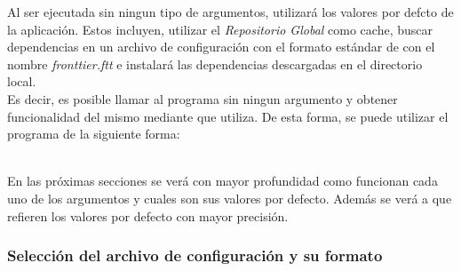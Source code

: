 Al ser ejecutada sin ningun tipo de argumentos, \fronttier utilizará los
valores por defcto de la aplicación. Estos incluyen, utilizar el
\emph{Repositorio Global} como cache, buscar dependencias en un archivo de
configuración con el formato estándar de \fronttier con el nombre
\emph{fronttier.ftt} e instalará las dependencias descargadas en el directorio
local.\\
Es decir, es posible llamar al programa sin ningun argumento y obtener
funcionalidad del mismo mediante  que \fronttier
utiliza. De esta forma, se puede utilizar el programa de la siguiente
forma:
\\En las próximas secciones se verá con mayor profundidad como funcionan
cada uno de los argumentos y cuales son sus valores por defecto.
Además se verá a que refieren los valores por defecto con mayor precisión.

\subsubsection{Selección del archivo de configuración y su formato}
\label{subsubsec:guide:confformat}

